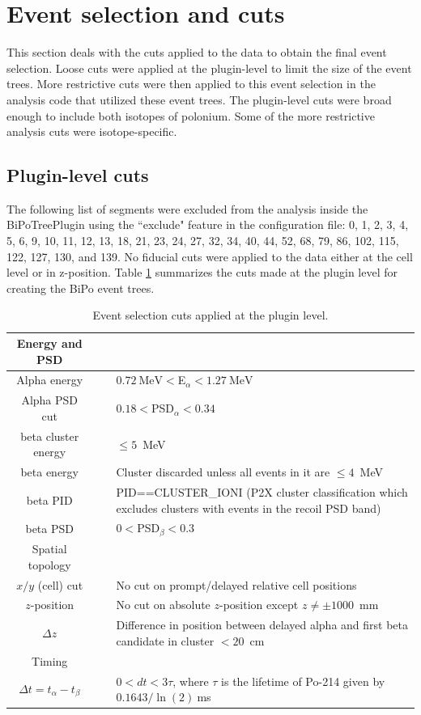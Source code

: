 \section{Event selection and cuts\label{sec:cuts}}
This section deals with the cuts applied to the data to obtain the final event selection. Loose cuts were applied at the plugin-level to limit the size of the event trees. More restrictive cuts were then applied to this event selection in the analysis code that utilized these event trees. The plugin-level cuts were broad enough to include both isotopes of polonium. Some of the more restrictive analysis cuts were isotope-specific.
\subsection{Plugin-level cuts}
The following list of segments were excluded from the analysis inside the BiPoTreePlugin using the ``exclude" feature in the configuration file: 0, 1, 2, 3, 4, 5, 6, 9, 10, 11, 12, 13, 18, 21, 23, 24, 27, 32, 34, 40, 44, 52, 68, 79, 86, 102, 115, 122, 127, 130, and 139. No fiducial cuts were applied to the data either at the cell level or in z-position.
Table \ref{tab:plugincuts} summarizes the cuts made at the plugin level for creating the BiPo event trees.
\begin{table}
\begin{center}
\caption{\label{tab:plugincuts}Event selection cuts applied at the plugin level.}
\begin{tabular}[ht]{c c p{10.5cm}}\hline
Energy and PSD&~&~\\\hline\hline
Alpha energy &\vline& $0.72~\textrm{MeV}<$E$_{\alpha}<1.27~\textrm{MeV}$\\
Alpha PSD cut& \vline&$0.18<$PSD$_{\alpha}<0.34$\\
beta cluster energy &\vline& $\leq 5$~MeV\\
beta energy & \vline&Cluster discarded unless all events in it are $\leq 4$~MeV\\
beta PID & \vline&PID==CLUSTER\_IONI (P2X cluster classification which excludes clusters with events in the recoil PSD band)\\
beta PSD & \vline&$0<$PSD$_{\beta}<0.3$\\\hline
Spatial topology&~&~\\\hline\hline
$x/y$ (cell) cut &\vline& No cut on prompt/delayed relative cell positions\\
$z$-position&\vline& No cut on absolute $z$-position except $z\neq \pm1000$~mm\\
$\Delta z$&\vline&Difference in position between delayed alpha and first beta candidate in cluster $<20$~cm\\\hline
Timing&~&~\\\hline\hline
$\Delta t=t_{\alpha}-t_{\beta}$&\vline &$0< dt < 3\tau$, where $\tau$ is the lifetime of Po-214 given by $0.1643/\ln{(2)}~$ms\\\hline

\end{tabular}
\end{center}
\end{table}

